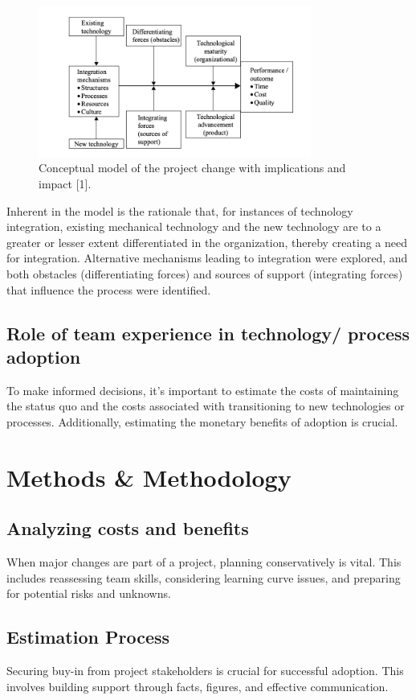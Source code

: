 \documentclass{article}
\begin{document}
\begin{figure}[h]
    \centering
    \includegraphics[width=0.8\textwidth]{Figure1.png}
    \caption{Conceptual model of the project change with implications and impact [1].}
    \label{fig:conceptual-model}
\end{figure}

Inherent in the model is the rationale that, for instances of technology integration, existing mechanical technology and the new technology are to a greater or lesser extent differentiated in the organization, thereby creating a need for integration. Alternative mechanisms leading to integration were explored, and both obstacles (differentiating forces) and sources of support (integrating forces) that influence the process were identified.


 
\subsection{Role of team experience in technology/ process adoption}
To make informed decisions, it's important to estimate the costs of maintaining the status quo and the costs associated with transitioning to new technologies or processes. Additionally, estimating the monetary benefits of adoption is crucial.

\section{Methods \& Methodology}
\subsection{Analyzing costs and benefits}
When major changes are part of a project, planning conservatively is vital. This includes reassessing team skills, considering learning curve issues, and preparing for potential risks and unknowns.
\subsection{Estimation Process}
Securing buy-in from project stakeholders is crucial for successful adoption. This involves building support through facts, figures, and effective communication.
\end{document}
